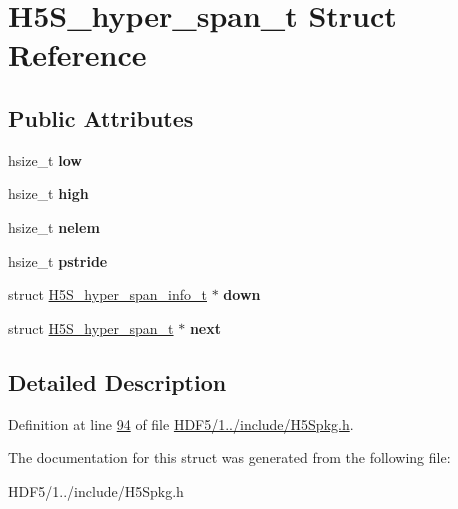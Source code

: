 \hypertarget{struct_h5_s__hyper__span__t}{}\section{H5\+S\+\_\+hyper\+\_\+span\+\_\+t Struct Reference}
\label{struct_h5_s__hyper__span__t}
\subsection*{Public Attributes}
\begin{DoxyCompactItemize}
\item 
\mbox{\label{struct_h5_s__hyper__span__t_a2b9db949013458fc905ca85f9f4e7700}} 
hsize\+\_\+t {\bfseries low}
\item 
\mbox{\label{struct_h5_s__hyper__span__t_a04e9b6f8cca28d7bfae1cbe15c0bb4d7}} 
hsize\+\_\+t {\bfseries high}
\item 
\mbox{\label{struct_h5_s__hyper__span__t_a3ba8db9151c0322e90bcb138bda67b04}} 
hsize\+\_\+t {\bfseries nelem}
\item 
\mbox{\label{struct_h5_s__hyper__span__t_a71dedf5f8c4cdf7f06e5efc68cd22a00}} 
hsize\+\_\+t {\bfseries pstride}
\item 
\mbox{\label{struct_h5_s__hyper__span__t_a8179e8a4941337aac0e360ba3bc0118d}} 
struct \hyperlink{struct_h5_s__hyper__span__info__t}{H5\+S\+\_\+hyper\+\_\+span\+\_\+info\+\_\+t} $\ast$ {\bfseries down}
\item 
\mbox{\label{struct_h5_s__hyper__span__t_a9896628b2a4e3748c2d998520d73847c}} 
struct \hyperlink{struct_h5_s__hyper__span__t}{H5\+S\+\_\+hyper\+\_\+span\+\_\+t} $\ast$ {\bfseries next}
\end{DoxyCompactItemize}


\subsection{Detailed Description}


Definition at line \hyperlink{_h_d_f5_21_810_81_2include_2_h5_spkg_8h_source_l00094}{94} of file \hyperlink{_h_d_f5_21_810_81_2include_2_h5_spkg_8h_source}{H\+D\+F5/1../include/\+H5\+Spkg.\+h}.



The documentation for this struct was generated from the following file\+:\begin{DoxyCompactItemize}
\item 
H\+D\+F5/1../include/\+H5\+Spkg.\+h\end{DoxyCompactItemize}
